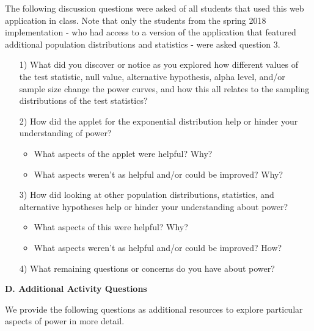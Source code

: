 \documentclass{TISE}
\begin{document}
The following discussion questions were asked of all students that used this web application in class. Note that only the students from the spring 2018 implementation - who had access to a version of the application that featured additional population distributions and statistics - were asked question 3. 

\begin{enumerate}
	\item[1)] What did you discover or notice as you explored how different values of the test statistic, null value, alternative hypothesis, alpha level, and/or sample size change the power curves, and how this all relates to the sampling distributions of the test statistics? \vspace{.5in}
	
	\item[2)] How did the applet for the exponential distribution help or hinder your understanding of power?
	\begin{itemize}
		\item What aspects of the applet were helpful? Why?
		\item What aspects weren't as helpful and/or could be improved? Why?
	\end{itemize} 

	\vspace{.5in}
	
	\item[3)] How did looking at other population distributions, statistics, and alternative hypotheses help or hinder your understanding about power?
	\begin{itemize}
		\item What aspects of this were helpful? Why?
		\item What aspects weren't as helpful and/or could be improved? How?
	\end{itemize}

	\vspace{.5in}

	\item[4)] What remaining questions or concerns do you have about power? \vspace{.5in}
\end{enumerate}

\newpage

\begin{center}
	\textbf{\large D. Additional Activity Questions}
\end{center}

We provide the following questions as additional resources to explore particular aspects of power in more detail.
\end{document}
